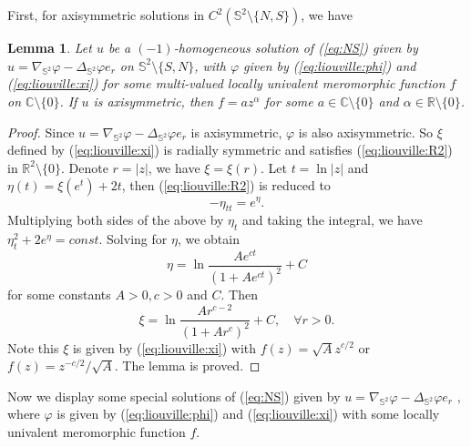 \documentclass[12pt]{article}
\newtheorem{lem}{Lemma}[section]
\newcommand{\bS}{\mathbb{S}}
\begin{document}
First, for axisymmetric solutions in $C^2(\mathbb{S}^2\setminus\{N,S\})$, we have

\begin{lem}
	Let $u$ be a $(-1)$-homogeneous solution of (\ref{eq:NS}) given by $u=\nabla_{\bS^2} \varphi-\Delta_{\bS^2} \varphi e_r$ on $\mathbb{S}^2\setminus\{S, N\}$, with $\varphi$ given by (\ref{eq:liouville:phi}) and (\ref{eq:liouville:xi}) for some multi-valued locally univalent meromorphic function $f$ on $\mathbb{C}\setminus\{0\}$. If $u$ is axisymmetric, then $f=a z^{\alpha}$ for some $a\in \mathbb{C}\setminus\{0\}$ and $\alpha\in\mathbb{R}\setminus\{0\}$. 
\end{lem}
\begin{proof}
	Since $u=\nabla_{\bS^2} \varphi-\Delta_{\bS^2} \varphi e_r$ is axisymmetric, $\varphi$ is also axisymmetric. So $\xi$ defined by (\ref{eq:liouville:xi}) is radially symmetric and satisfies (\ref{eq:liouville:R2}) in $\mathbb{R}^2\setminus\{0\}$. Denote $r=|z|$, we have $\xi=\xi(r)$. Let $t=\ln |z|$ and $\eta(t)=\xi(e^t)+2t$, then (\ref{eq:liouville:R2}) is reduced to 
	\[
		- \eta_{tt}=e^{\eta}. 
	\]
	Multiplying both sides of the above by $\eta_t$ and taking the integral, we have $\eta_t^2+2e^{\eta}=const$. Solving for $\eta$, we obtain 
	\[
		\eta=\ln \frac{Ae^{ct}}{(1+Ae^{ct})^2}+C
	\]
	for some constants $A>0, c>0$ and $C$. Then 
	\[
		\xi=\ln\frac{Ar^{c-2}}{(1+Ar^c)^2}+C, \quad \forall r>0.
	\]
	Note this $\xi$ is given by (\ref{eq:liouville:xi}) with $f(z)=\sqrt{A}z^{c/2}$ or $f(z)=z^{-c/2}/\sqrt{A}$. The lemma is proved.
\end{proof}

Now we display some special solutions of (\ref{eq:NS}) given by $u=\nabla_{\bS^2} \varphi-\Delta_{\bS^2} \varphi e_r$ , where $\varphi$ is given by (\ref{eq:liouville:phi}) and (\ref{eq:liouville:xi}) with some locally univalent meromorphic function $f$. 
\end{document}
